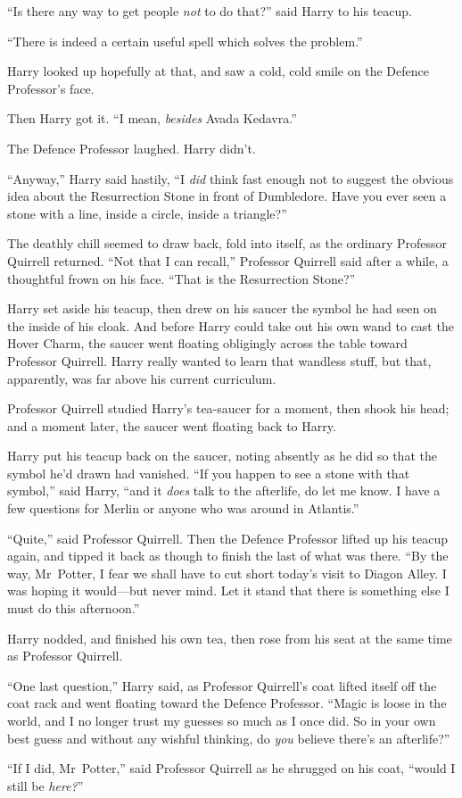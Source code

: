 “Is there any way to get people \emph{not} to do that?” said Harry to his teacup.

“There is indeed a certain useful spell which solves the problem.”

Harry looked up hopefully at that, and saw a cold, cold smile on the Defence Professor’s face.

Then Harry got it. “I mean, \emph{besides} Avada Kedavra.”

The Defence Professor laughed. Harry didn’t.

“Anyway,” Harry said hastily, “I \emph{did} think fast enough not to suggest the obvious idea about the Resurrection Stone in front of Dumbledore. Have you ever seen a stone with a line, inside a circle, inside a triangle?”

The deathly chill seemed to draw back, fold into itself, as the ordinary Professor Quirrell returned. “Not that I can recall,” Professor Quirrell said after a while, a thoughtful frown on his face. “That is the Resurrection Stone?”

Harry set aside his teacup, then drew on his saucer the symbol he had seen on the inside of his cloak. And before Harry could take out his own wand to cast the Hover Charm, the saucer went floating obligingly across the table toward Professor Quirrell. Harry really wanted to learn that wandless stuff, but that, apparently, was far above his current curriculum.

Professor Quirrell studied Harry’s tea-saucer for a moment, then shook his head; and a moment later, the saucer went floating back to Harry.

Harry put his teacup back on the saucer, noting absently as he did so that the symbol he’d drawn had vanished. “If you happen to see a stone with that symbol,” said Harry, “and it \emph{does} talk to the afterlife, do let me know. I have a few questions for Merlin or anyone who was around in Atlantis.”

“Quite,” said Professor Quirrell. Then the Defence Professor lifted up his teacup again, and tipped it back as though to finish the last of what was there. “By the way, Mr~Potter, I fear we shall have to cut short today’s visit to Diagon Alley. I was hoping it would—but never mind. Let it stand that there is something else I must do this afternoon.”

Harry nodded, and finished his own tea, then rose from his seat at the same time as Professor Quirrell.

“One last question,” Harry said, as Professor Quirrell’s coat lifted itself off the coat rack and went floating toward the Defence Professor. “Magic is loose in the world, and I no longer trust my guesses so much as I once did. So in your own best guess and without any wishful thinking, do \emph{you} believe there’s an afterlife?”

“If I did, Mr~Potter,” said Professor Quirrell as he shrugged on his coat, “would I still be \emph{here?}”

